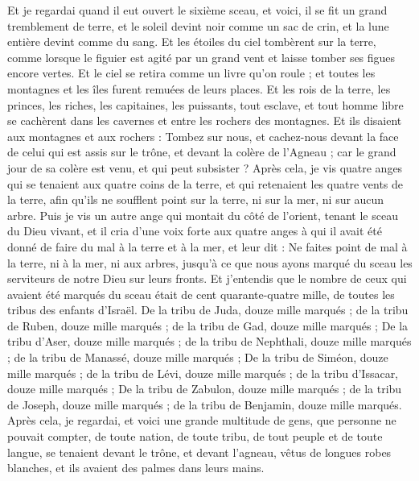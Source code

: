 \begin{multicols}{2}
Et je regardai quand il eut ouvert le sixième sceau, et voici, il se fit un grand tremblement de terre, et le soleil devint noir comme un sac de crin, et la lune entière devint comme du sang.
Et les étoiles du ciel tombèrent sur la terre{}, comme lorsque le figuier est agité par un grand vent et laisse tomber ses figues encore vertes.
Et le ciel se retira comme un livre qu'on roule ; et toutes les montagnes et les îles furent remuées de leurs places.
Et les rois de la terre, les princes, les riches, les capitaines, les puissants, tout esclave, et tout homme libre se cachèrent dans les cavernes et entre les rochers des montagnes.
Et ils disaient aux montagnes et aux rochers : Tombez sur nous{}, et cachez-nous devant la face de celui qui est assis sur le trône, et devant la colère de l'Agneau ;
car le grand jour de sa colère est venu, et qui peut subsister ?
\VerseOne{}Après cela, je vis quatre anges qui se tenaient aux quatre coins de la terre, et qui retenaient les quatre vents de la terre, afin qu’ils ne soufflent point sur la terre, ni sur la mer, ni sur aucun arbre.
Puis je vis un autre ange qui montait du côté de l'orient, tenant le sceau du Dieu vivant, et il cria d’une voix forte aux quatre anges à qui il avait été donné de faire du mal à la terre et à la mer,
et leur dit : Ne faites point de mal à la terre, ni à la mer, ni aux arbres, jusqu'à ce que nous ayons marqué du sceau les serviteurs de notre Dieu sur leurs fronts.
Et j'entendis que le nombre de ceux qui avaient été marqués du sceau était de cent quarante-quatre mille, de toutes les tribus des enfants d'Israël.
De la tribu de Juda, douze mille marqués ; de la tribu de Ruben, douze mille marqués ; de la tribu de Gad, douze mille marqués ;
De la tribu d'Aser, douze mille marqués ; de la tribu de Nephthali, douze mille marqués ; de la tribu de Manassé, douze mille marqués ;
De la tribu de Siméon, douze mille marqués ; de la tribu de Lévi, douze mille marqués ; de la tribu d'Issacar, douze mille marqués ;
De la tribu de Zabulon, douze mille marqués ; de la tribu de Joseph, douze mille marqués ; de la tribu de Benjamin, douze mille marqués.
Après cela, je regardai, et voici une grande multitude de gens, que personne ne pouvait compter, de toute nation, de toute tribu, de tout peuple et de toute langue, se tenaient devant le trône, et devant l'agneau, vêtus de longues robes blanches, et ils avaient des palmes dans leurs mains.

\end{multicols}
